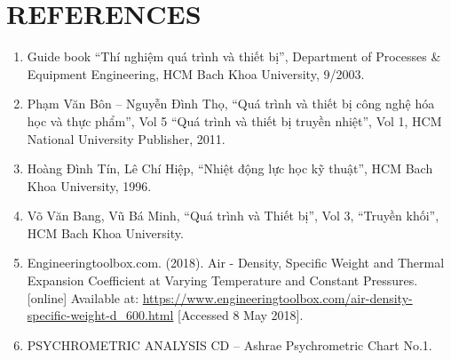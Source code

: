 \section{REFERENCES}
\begin{enumerate}
    \item Guide book ``Thí nghiệm quá trình và thiết bị'', Department of Processes \& Equipment Engineering, HCM Bach Khoa University, 9/2003.
    \item Phạm Văn Bôn -- Nguyễn Đình Thọ, ``Quá trình và thiết bị công nghệ hóa học và thực phẩm'', Vol 5 ``Quá trình và thiết bị truyền nhiệt'', Vol 1, HCM National University Publisher, 2011.
    \item Hoàng Đình Tín, Lê Chí Hiệp, ``Nhiệt động lực học kỹ thuật'', HCM Bach Khoa University, 1996.
    \item Võ Văn Bang, Vũ Bá Minh, ``Quá trình và Thiết bị'', Vol 3, ``Truyền khối'', HCM Bach Khoa University.
    \item Engineeringtoolbox.com. (2018). Air - Density, Specific Weight and Thermal Expansion Coefficient at Varying Temperature and Constant Pressures. [online] Available at: \url{https://www.engineeringtoolbox.com/air-density-specific-weight-d_600.html} [Accessed 8 May 2018].
    \item PSYCHROMETRIC ANALYSIS CD -- Ashrae Psychrometric Chart No.1.
\end{enumerate}

